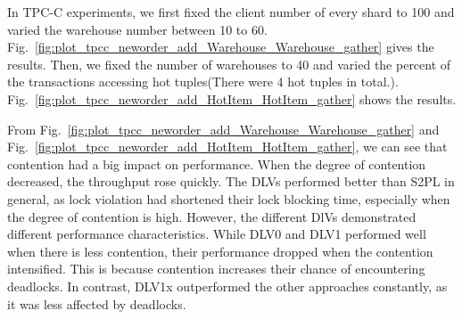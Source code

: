 \documentclass[conference]{IEEEtran}
\begin{document}
In TPC-C experiments, we first fixed the client number of every shard to 100 and varied the warehouse number between 10 to 60.
Fig.~\ref{fig:plot_tpcc_neworder_add_Warehouse_Warehouse_gather} gives the results.
Then, we fixed the number of warehouses to 40 and varied the percent of the transactions accessing hot tuples(There were 4 hot tuples in total.).
Fig.~\ref{fig:plot_tpcc_neworder_add_HotItem_HotItem_gather} shows the results.

From Fig.~\ref{fig:plot_tpcc_neworder_add_Warehouse_Warehouse_gather} and
Fig.~\ref{fig:plot_tpcc_neworder_add_HotItem_HotItem_gather},
we can see that contention had a big impact on performance. When the degree of contention decreased, the throughput rose quickly.
The DLVs performed better than S2PL in general, as lock violation had shortened their lock blocking time, especially when the degree of contention is high.
However, the different DlVs demonstrated different performance characteristics. 
While DLV0 and DLV1 performed well when there is less contention, their performance dropped when the contention intensified.
This is because contention increases their chance of encountering deadlocks.
In contrast, DLV1x outperformed the other approaches constantly, as it was less affected by deadlocks.
\end{document}
